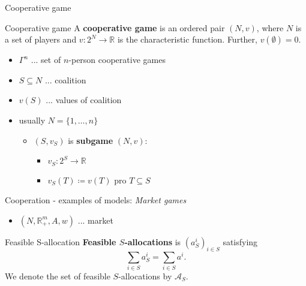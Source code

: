\documentclass{beamer}
\begin{document}
\begin{frame}{Cooperative game}
    \begin{block}{Cooperative game}
        \pause
        A \textbf{cooperative game} is an ordered pair $(N,v)$, where $N$ is a set of players and $v\colon 2^N \to \mathbb{R}$ is the characteristic function. Further, $v(\emptyset) = 0$.
    \end{block}
    \begin{itemize}
        \item<5-> $\Gamma^n$ ... set of $n$-person cooperative games
        \item<3-> $S \subseteq N$ ... coalition
        \item<4-> $v(S)$ ... values of coalition
        \item<6-> usually $N = \{1,\dots,n\}$
        \begin{itemize}
            \item<7-> $(S,v_S)$ is \textbf{subgame} $(N,v)$:
            \begin{itemize}
                \item<7-> $v_S \colon 2^S \to \mathbb{R}$
                \item<7-> $v_S(T) \coloneqq v(T)$ pro $T \subseteq S$
            \end{itemize}
        \end{itemize}
    \end{itemize}
	
\end{frame}



\begin{frame}{Cooperation - examples of models: \textit{Market games}}
 	\begin{itemize}
 		\item $(N,\mathbb{R}^m_+,A,w)$ ... market
	\end{itemize}
	\begin{block}{Feasible S-allocation}
		\textbf{Feasible $S$-allocations} is $(a_S^i)_{i \in S}$ satisfying
		\[
		\sum_{i \in S}a^i_S = \sum_{i \in S}a^i.
		\]
		We denote the set of feasible $S$-allocations by $\mathcal{A}_S$.
	\end{block}
\end{frame}


\end{document}
